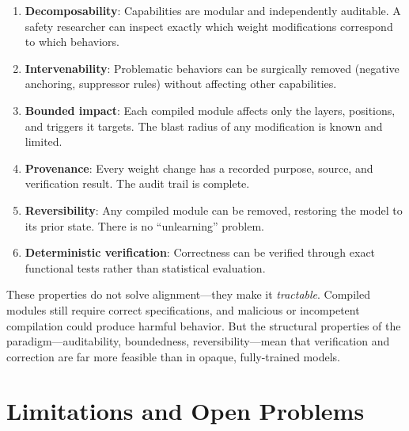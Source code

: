 \documentclass[11pt,a4paper]{article}
\begin{document}
\begin{enumerate}[leftmargin=*]
\item \textbf{Decomposability}: Capabilities are modular and independently auditable. A safety researcher can inspect exactly which weight modifications correspond to which behaviors.
\item \textbf{Intervenability}: Problematic behaviors can be surgically removed (negative anchoring, suppressor rules) without affecting other capabilities.
\item \textbf{Bounded impact}: Each compiled module affects only the layers, positions, and triggers it targets. The blast radius of any modification is known and limited.
\item \textbf{Provenance}: Every weight change has a recorded purpose, source, and verification result. The audit trail is complete.
\item \textbf{Reversibility}: Any compiled module can be removed, restoring the model to its prior state. There is no ``unlearning'' problem.
\item \textbf{Deterministic verification}: Correctness can be verified through exact functional tests rather than statistical evaluation.
\end{enumerate}

These properties do not solve alignment---they make it \emph{tractable}. Compiled modules still require correct specifications, and malicious or incompetent compilation could produce harmful behavior. But the structural properties of the paradigm---auditability, boundedness, reversibility---mean that verification and correction are far more feasible than in opaque, fully-trained models.

\section{Limitations and Open Problems}
\end{document}
